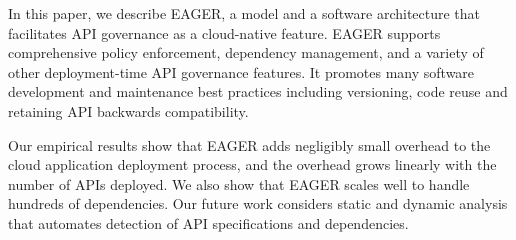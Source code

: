 In this paper, we describe EAGER, a model and a software architecture that 
facilitates API governance as a cloud-native feature. EAGER supports comprehensive policy
enforcement, dependency management, and a variety of other deployment-time API
governance features. It promotes many software development and maintenance
best practices including versioning, code reuse and retaining API backwards
compatibility. 

Our empirical results 
show that EAGER adds negligibly small overhead to the cloud application 
deployment process, and the overhead grows linearly
with the number of APIs deployed. We also show that EAGER scales well 
to handle hundreds of dependencies. 
Our future work considers static and dynamic analysis
that automates detection of API specifications and dependencies.
